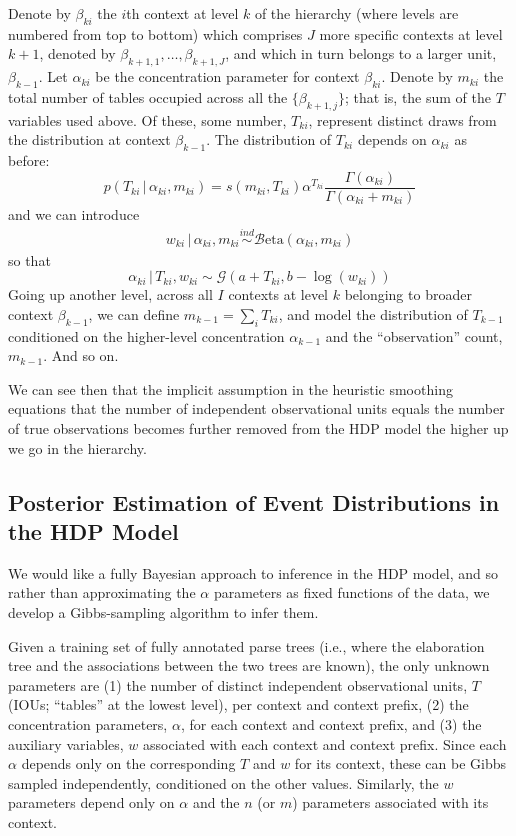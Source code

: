 \documentclass[12pt,letterpaper]{report}
\newcommand{\Gamm}[2]{\mathcal{G}(#1,#2)}
\newcommand{\Beta}[2]{\mathcal{B}\mathrm{eta}(#1,#2)}
\newcommand{\given}{\, \vert \,}
\begin{document}
Denote by $\beta_{ki}$ the $i$th context at level $k$ of the hierarchy
(where levels are numbered from top to bottom) which comprises $J$ more
specific contexts at level $k+1$, denoted by $\beta_{k+1,1}, \dots,
\beta_{k+1,J}$, and which in turn belongs to a larger unit, $\beta_{k-1}$.  
Let $\alpha_{ki}$ be the concentration parameter for context
$\beta_{ki}$.  Denote by $m_{ki}$ the total number of tables occupied across
all the $\{\beta_{k+1,j}\}$; that is, the sum of the $T$ variables
used above.  Of these, some number, $T_{ki}$, represent distinct draws
from the distribution at context $\beta_{k-1}$.  The distribution of
$T_{ki}$ depends on $\alpha_{ki}$ as before:
\begin{equation}
   p(T_{ki} \given \alpha_{ki}, m_{ki}) = s(m_{ki}, T_{ki}) \alpha^{T_{ki}} \frac{\Gamma(\alpha_{ki})}{\Gamma(\alpha_{ki} + m_{ki})}
\end{equation}
and we can introduce
\begin{align}
  \label{eq:w-definition}
  w_{ki} \given \alpha_{ki}, m_{ki} \stackrel{ind}{\sim} \Beta{\alpha_{ki}}{m_{ki}}
\end{align}
so that
\begin{equation}
  \alpha_{ki} \given T_{ki}, w_{ki} \sim \Gamm{a + T_{ki}}{b - \log(w_{ki})}
\end{equation}
Going up another level, across all $I$ contexts at level $k$ belonging
to broader context $\beta_{k-1}$, we can define $m_{k-1} = \sum_i
T_{ki}$, and model the distribution of $T_{k-1}$ conditioned on the
higher-level concentration $\alpha_{k-1}$ and the ``observation''
count, $m_{k-1}$.  And so on.

We can see then that the implicit assumption in the heuristic
smoothing equations that the number of independent observational units
equals the number of true observations becomes further removed from
the HDP model the higher up we go in the hierarchy.

\subsection{Posterior Estimation of Event Distributions in the HDP
  Model}

We would like a fully Bayesian approach to inference in the HDP model,
and so rather than approximating the $\alpha$ parameters as fixed functions of the
data, we develop a Gibbs-sampling algorithm to infer them.

Given a training set of fully annotated parse trees (i.e., where the
elaboration tree and the associations between the two trees are
known), the only unknown parameters are (1) the number of distinct
independent observational units, $T$ (IOUs; ``tables'' at the lowest level), 
per context and context prefix, (2) the concentration
parameters, $\alpha$, for each context and context prefix, and (3) the auxiliary
variables, $w$ associated with each context and context prefix.  Since
each $\alpha$ depends only on the corresponding $T$ and $w$ for its
context, these can be Gibbs sampled independently, conditioned on the
other values.  Similarly, the $w$ parameters depend only on $\alpha$
and the $n$ (or $m$) parameters associated with its context.
\end{document}
